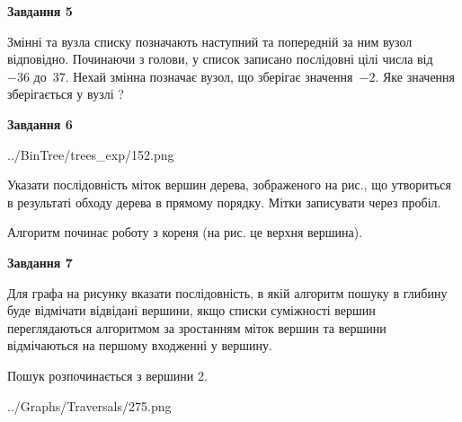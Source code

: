 \documentclass[12pt, ukrainian]{article}
\begin{document}
{\begin {large}
{\begin {center}\textbf{Завдання 5}\end {center}}\par
Змінні  та  вузла списку позначають наступний та попередній за ним вузол відповідно. Починаючи з голови, у список записано послідовні цілі числа від~$-36$ до~$37$. Нехай змінна  позначає вузол, що зберігає значення~$-2$.
Яке значення зберігається у вузлі  ?\par
\newpage

{\begin {center}\textbf{Завдання 6}\end {center}}\par

\begin{center}
	{../BinTree/trees_exp/152.png}
\end{center}
Указати послідовність міток вершин дерева, зображеного на рис., що утвориться в результаті обходу дерева в прямому порядку. Мітки записувати через пробіл.\par Алгоритм починає роботу з кореня (на рис. це верхня вершина).\par
\newpage

{\begin {center}\textbf{Завдання 7}\end {center}}\par
Для графа на рисунку вказати послідовність, в якій алгоритм пошуку в глибину буде відмічати відвідані вершини, якщо списки суміжності вершин переглядаються алгоритмом за зростанням міток вершин та вершини відмічаються на першому вход\-женні у вершину.\par
Пошук розпочинається з вершини 2.\par

\begin{center}
	{../Graphs/Traversals/275.png}
\end{center}\par
\newpage


\end{large}}
\end{document}
